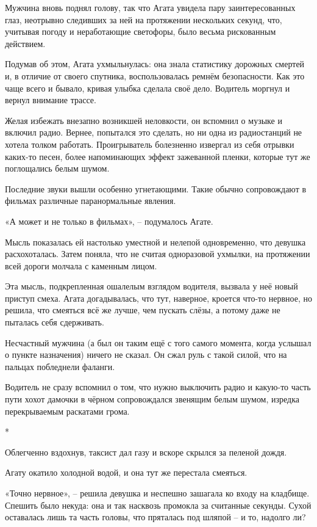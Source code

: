 \documentclass[
  a5paperpaper,
  DIV=11,
  numbers=noendperiod]{scrreprt}
\begin{document}
Мужчина вновь поднял голову, так что Агата увидела пару заинтересованных
глаз, неотрывно следивших за ней на протяжении нескольких секунд, что,
учитывая погоду и неработающие светофоры, было весьма рискованным
действием.

Подумав об этом, Агата ухмыльнулась: она знала статистику дорожных
смертей и, в отличие от своего спутника, воспользовалась ремнём
безопасности. Как это чаще всего и бывало, кривая улыбка сделала своё
дело. Водитель моргнул и вернул внимание трассе.

Желая избежать внезапно возникшей неловкости, он вспомнил о музыке и
включил радио. Вернее, попытался это сделать, но ни одна из радиостанций
не хотела толком работать. Проигрыватель болезненно извергал из себя
отрывки каких-то песен, более напоминающих эффект зажеванной пленки,
которые тут же поглощались белым шумом.

Последние звуки вышли особенно угнетающими. Такие обычно сопровождают в
фильмах различные паранормальные явления.

«А может и не только в фильмах», -- подумалось Агате.

Мысль показалась ей настолько уместной и нелепой одновременно, что
девушка расхохоталась. Затем поняла, что не считая одноразовой ухмылки,
на протяжении всей дороги молчала с каменным лицом.

Эта мысль, подкрепленная ошалелым взглядом водителя, вызвала у неё новый
приступ смеха. Агата догадывалась, что тут, наверное, кроется что-то
нервное, но решила, что смеяться всё же лучше, чем пускать слёзы, а
потому даже не пыталась себя сдерживать.

Несчастный мужчина (а был он таким ещё с того самого момента, когда
услышал о пункте назначения) ничего не сказал. Он сжал руль с такой
силой, что на пальцах побледнели фаланги.

Водитель не сразу вспомнил о том, что нужно выключить радио и какую-то
часть пути хохот дамочки в чёрном сопровождался звенящим белым шумом,
изредка перекрываемым раскатами грома.

*

Облегченно вздохнув, таксист дал газу и вскоре скрылся за пеленой дождя.

Агату окатило холодной водой, и она тут же перестала смеяться.

«Точно нервное», -- решила девушка и неспешно зашагала ко входу на
кладбище. Спешить было некуда: она и так насквозь промокла за считанные
секунды. Сухой оставалась лишь та часть головы, что пряталась под шляпой
-- и то, надолго ли?
\end{document}

